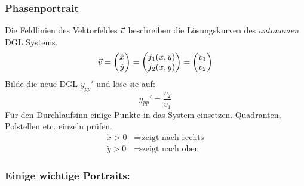     \subsubsection{Phasenportrait}
        Die Feldlinien des Vektorfeldes $\vec{v}$ beschreiben die Lösungskurven des \textit{autonomen} DGL Systems.
        $$
            \vec{v} =
            \begin{pmatrix}
                \dot{x}\\ \dot{y}
            \end{pmatrix}
            =
            \begin{pmatrix}
                f_1(x,y)\\f_2(x,y)
            \end{pmatrix}
            = 
            \begin{pmatrix}
                 v_1 \\ v_2   
            \end{pmatrix}
        $$
        \vspace{0.5em}
        Bilde die neue DGL $y_{pp}'$ und löse sie auf:
        $$
            y_{pp}' = \frac{v_2}{v_1}
        $$  
        Für den Durchlaufsinn einige Punkte in das System einsetzen. Quadranten, Polstellen etc. einzeln prüfen.
        \begin{align*}
            \dot{x} > 0 & \Rightarrow \textrm{zeigt nach rechts} \\
            \dot{y} > 0 & \Rightarrow \textrm{zeigt nach oben}
        \end{align*}
        
    \subsubsection{Einige wichtige Portraits:}
    